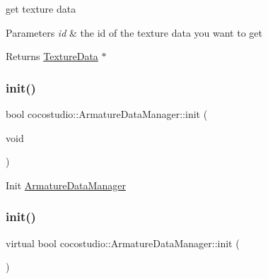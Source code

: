 get texture data 


\begin{DoxyParams}{Parameters}
{\em id} & the id of the texture data you want to get \\
\hline
\end{DoxyParams}
\begin{DoxyReturn}{Returns}
\hyperlink{classcocostudio_1_1TextureData}{Texture\+Data} $\ast$ 
\end{DoxyReturn}
\mbox{\label{classcocostudio_1_1ArmatureDataManager_ae06a336867256bd67f78ec38e14e9fd9}} 
\subsubsection{\texorpdfstring{init()}{init()}\hspace{0.1cm}{\footnotesize\ttfamily [1/2]}}
{\footnotesize\ttfamily bool cocostudio\+::\+Armature\+Data\+Manager\+::init (\begin{DoxyParamCaption}\item[{void}]{ }\end{DoxyParamCaption})\hspace{0.3cm}{\ttfamily [virtual]}}

Init \hyperlink{classcocostudio_1_1ArmatureDataManager}{Armature\+Data\+Manager} \mbox{\label{classcocostudio_1_1ArmatureDataManager_ae9e571092820f26fc2c6a841a91b2b38}} 
\subsubsection{\texorpdfstring{init()}{init()}\hspace{0.1cm}{\footnotesize\ttfamily [2/2]}}
{\footnotesize\ttfamily virtual bool cocostudio\+::\+Armature\+Data\+Manager\+::init (\begin{DoxyParamCaption}{ }\end{DoxyParamCaption})\hspace{0.3cm}{\ttfamily [virtual]}}

